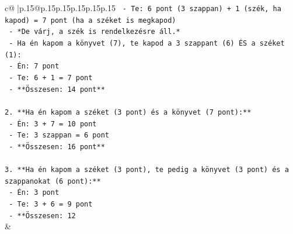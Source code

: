 \documentclass{article}
\begin{document}
{\begin{supertabular}{c@{$\;$}|p{.15\linewidth}@{}p{.15\linewidth}p{.15\linewidth}p{.15\linewidth}p{.15\linewidth}p{.15\linewidth}}
{{{\texttt{    {-} Te: 6 pont (3 szappan) + 1 (szék, ha kapod) = 7 pont (ha a széket is megkapod)} \\
\texttt{    {-} *De várj, a szék is rendelkezésre áll.*} \\
\texttt{    {-} Ha én kapom a könyvet (7), te kapod a 3 szappant (6) ÉS a széket (1):} \\
\texttt{        {-} Én: 7 pont} \\
\texttt{        {-} Te: 6 + 1 = 7 pont} \\
\texttt{        {-} **Összesen: 14 pont**} \\
\\ 
\texttt{2.  **Ha én kapom a széket (3 pont) és a könyvet (7 pont):**} \\
\texttt{    {-} Én: 3 + 7 = 10 pont} \\
\texttt{    {-} Te: 3 szappan = 6 pont} \\
\texttt{    {-} **Összesen: 16 pont**} \\
\\ 
\texttt{3.  **Ha én kapom a széket (3 pont), te pedig a könyvet (3 pont) és a szappanokat (6 pont):**} \\
\texttt{    {-} Én: 3 pont} \\
\texttt{    {-} Te: 3 + 6 = 9 pont} \\
\texttt{    {-} **Összesen: 12} \\
            }
        }
    }
    & \\ \\


\end{supertabular}}
\end{document}
